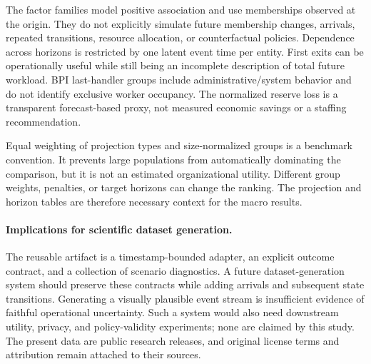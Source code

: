 The factor families model positive association and use memberships observed at
the origin. They do not explicitly simulate future membership changes,
arrivals, repeated transitions, resource allocation, or counterfactual policies.
Dependence across horizons is restricted by one latent event time per entity.
First exits can be operationally useful while still being an incomplete
description of total future workload. BPI last-handler groups include
administrative/system behavior and do not identify exclusive worker occupancy.
The normalized reserve loss is a transparent forecast-based proxy, not measured
economic savings or a staffing recommendation.

Equal weighting of projection types and size-normalized groups is a benchmark
convention. It prevents large populations from automatically dominating the
comparison, but it is not an estimated organizational utility. Different group
weights, penalties, or target horizons can change the ranking. The projection
and horizon tables are therefore necessary context for the macro results.

\paragraph{Implications for scientific dataset generation.}
The reusable artifact is a timestamp-bounded adapter, an explicit outcome
contract, and a collection of scenario diagnostics. A future dataset-generation
system should preserve these contracts while adding arrivals and subsequent
state transitions. Generating a visually plausible event stream is insufficient
evidence of faithful operational uncertainty. Such a system would also need
downstream utility, privacy, and policy-validity experiments; none are claimed
by this study. The present data are public research releases, and original
license terms and attribution remain attached to their sources.
